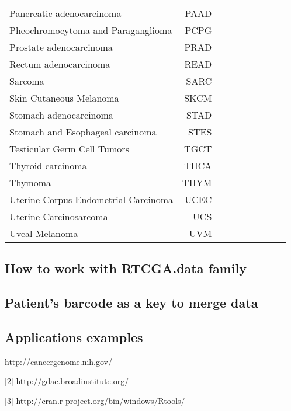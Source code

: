 \begin{table}[h!]
\begin{tabular}{lrrrrrr}
Pancreatic adenocarcinoma & PAAD    & \ & \ & \ & \ & \ \\
Pheochromocytoma and Paraganglioma &    PCPG & \ & \ & \ & \ & \    \\
Prostate adenocarcinoma &   PRAD & \ & \ & \ & \ & \    \\
Rectum adenocarcinoma & READ & \ & \ & \ & \ & \    \\
Sarcoma &   SARC    & \ & \ & \ & \ & \ \\
Skin Cutaneous Melanoma &   SKCM    & \ & \ & \ & \ & \ \\
Stomach adenocarcinoma &    STAD    & \ & \ & \ & \ & \ \\
Stomach and Esophageal carcinoma &  STES    & \ & \ & \ & \ & \ \\
Testicular Germ Cell Tumors &   TGCT    & \ & \ & \ & \ & \ \\
Thyroid carcinoma & THCA    & \ & \ & \ & \ & \ \\
Thymoma &   THYM    & \ & \ & \ & \ & \ \\
Uterine Corpus Endometrial Carcinoma &  UCEC & \ & \ & \ & \ & \    \\
Uterine Carcinosarcoma &    UCS & \ & \ & \ & \ & \ \\
Uveal Melanoma &    UVM & \ & \ & \ & \ & \ \\
\bottomrule
\end{tabular}

\end{table}

\normalsize

\subsection{How to work with RTCGA.data
family}\label{how-to-work-with-rtcga.data-family}

\subsection{Patient's barcode as a key to merge
data}\label{patients-barcode-as-a-key-to-merge-data}

\subsection{Applications examples}\label{applications-examples}

\begin{Schunk}
\begin{Sinput}
[1] http://cancergenome.nih.gov/

[2] http://gdac.broadinstitute.org/
   
[3] http://cran.r-project.org/bin/windows/Rtools/


\end{Sinput}
\end{Schunk}

